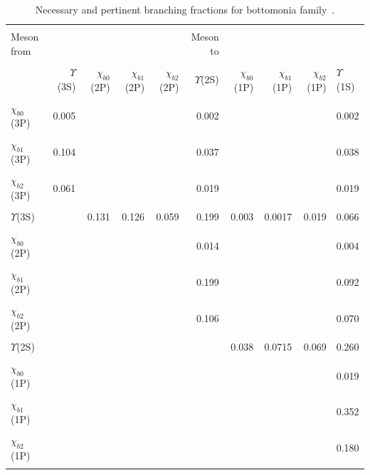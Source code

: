 \begin{table}
  \centering
  \caption{Necessary and pertinent branching fractions for bottomonia family~\cite{Han:2014kxa,Zyla:2020zbs}.}
  \footnotesize
  \begin{tabular*}{\textwidth}{@{\extracolsep{\fill}}lrrrrrrrrl@{}}
    \hline
    \hline
    & & & & & & & & &\\
    Meson from & & & & & Meson to & & & & \\ \\
    \hline 
    &$\Upsilon$(3S) &$\chi_{b0}$(2P) &$\chi_{b1}$(2P) &$\chi_{b2}$(2P) &$\Upsilon$(2S) &$\chi_{b0}$(1P) &$\chi_{b1}$(1P) &$\chi_{b2}$(1P) &$\Upsilon$(1S)\\
    \hline
    \hline \\
    $\chi_{b0}$(3P) &0.005 & & & &0.002 & & & & 0.002 \\ \\
    $\chi_{b1}$(3P) &0.104 & & & &0.037 & & & & 0.038 \\ \\
    $\chi_{b2}$(3P) &0.061 & & & &0.019 & & & & 0.019 \\ \\
    $\Upsilon$(3S) & & 0.131 &0.126 & 0.059 & 0.199 & 0.003 & 0.0017 & 0.019 & 0.066 \\ \\
    $\chi_{b0}$(2P) & & & & &0.014 & & & & 0.004 \\ \\
    $\chi_{b1}$(2P) & & & & &0.199 & & & & 0.092 \\ \\
    $\chi_{b2}$(2P) & & & & &0.106 & & & & 0.070 \\ \\
    $\Upsilon$(2S) & & & & & & 0.038 & 0.0715 & 0.069 & 0.260 \\ \\
    $\chi_{b0}$(1P) & & & & & & & & & 0.019 \\ \\
    $\chi_{b1}$(1P) & & & & & & & & & 0.352 \\ \\
    $\chi_{b2}$(1P) & & & & & & & & & 0.180 \\ \\
    \hline
    \hline
  \end{tabular*}
  \label{BRUpsilon}
\end{table}
